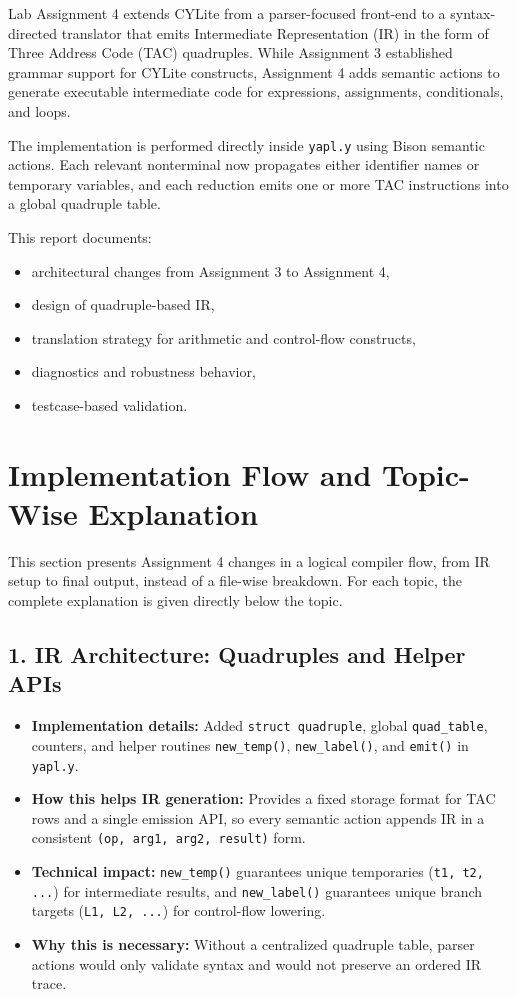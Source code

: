 \documentclass[a4paper,12pt]{article}
\begin{document}
Lab Assignment 4 extends CYLite from a parser-focused front-end to a syntax-directed translator that emits Intermediate Representation (IR) in the form of Three Address Code (TAC) quadruples. While Assignment 3 established grammar support for CYLite constructs, Assignment 4 adds semantic actions to generate executable intermediate code for expressions, assignments, conditionals, and loops.

The implementation is performed directly inside \texttt{yapl.y} using Bison semantic actions. Each relevant nonterminal now propagates either identifier names or temporary variables, and each reduction emits one or more TAC instructions into a global quadruple table.

This report documents:
\begin{itemize}
    \item architectural changes from Assignment 3 to Assignment 4,
    \item design of quadruple-based IR,
    \item translation strategy for arithmetic and control-flow constructs,
    \item diagnostics and robustness behavior,
    \item testcase-based validation.
\end{itemize}

\singlespacing

\section{Implementation Flow and Topic-Wise Explanation}

This section presents Assignment 4 changes in a logical compiler flow, from IR setup to final output, instead of a file-wise breakdown. For each topic, the complete explanation is given directly below the topic.

\subsection{1. IR Architecture: Quadruples and Helper APIs}
\begin{itemize}
    \item \textbf{Implementation details:} Added \texttt{struct quadruple}, global \texttt{quad\_table}, counters, and helper routines \texttt{new\_temp()}, \texttt{new\_label()}, and \texttt{emit()} in \texttt{yapl.y}.
    \item \textbf{How this helps IR generation:} Provides a fixed storage format for TAC rows and a single emission API, so every semantic action appends IR in a consistent \texttt{(op, arg1, arg2, result)} form.
    \item \textbf{Technical impact:} \texttt{new\_temp()} guarantees unique temporaries (\texttt{t1, t2, ...}) for intermediate results, and \texttt{new\_label()} guarantees unique branch targets (\texttt{L1, L2, ...}) for control-flow lowering.
    \item \textbf{Why this is necessary:} Without a centralized quadruple table, parser actions would only validate syntax and would not preserve an ordered IR trace.
\end{itemize}
\end{document}
